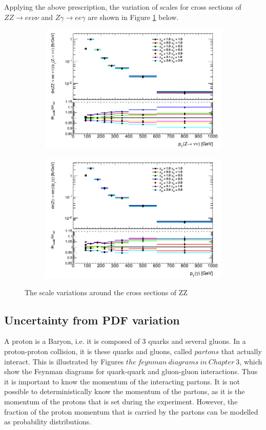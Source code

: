 \documentclass[11pt,a4paper]{report}
\begin{document}
Applying the above prescription, the variation of scales for cross sections of $ZZ\to ee\nu\nu$ and $Z\gamma\to ee\gamma$ are shown in Figure \ref{fig:scale_xsec} below.
\begin{figure}[H]
\centering
	\begin{subfigure}{0.49\textwidth}
		\includegraphics[width=\linewidth]{zz_scale.png}
	\end{subfigure}
	\begin{subfigure}{0.49\textwidth}
		\includegraphics[width=\linewidth]{zg_scale.png}
	\end{subfigure}
	\caption{The scale variations around the cross sections of ZZ}
	\label{fig:scale_xsec}
\end{figure}

\subsection{Uncertainty from PDF variation}
A proton is a Baryon, i.e. it is composed of 3 quarks and several gluons. In a proton-proton collision, it is these quarks and gluons, called $partons$ that actually interact. This is illustrated by Figures $the\ feynman\ diagrams\ in\ Chapter\ 3$, which show the Feynman diagrams for quark-quark and gluon-gluon interactions. Thus it is important to know the momentum of the interacting partons. It is not possible to deterministically know the momentum of the partons, as it is the momentum of the protons that is set during the experiment. However, the fraction of the proton momentum that is carried by the partons can be modelled as probability distributions.
\end{document}
